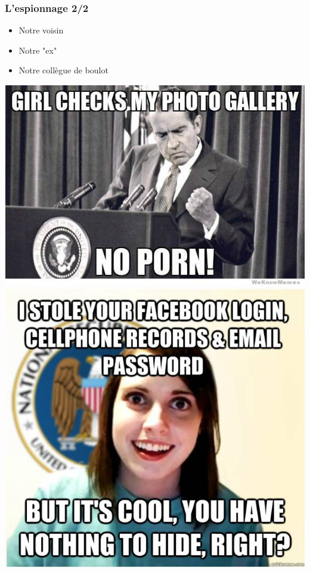 \documentclass{beamer}
\begin{document}
\begin{frame}
\frametitle{L'espionnage 2/2}
\begin{itemize}
\item Notre voisin
\item Notre "ex"
\item Notre collègue de boulot 
\end{itemize}
\includegraphics[scale=0.55]{./images/nixon.jpg}
\includegraphics[scale=0.4]{./images/girlfriend.jpg}
\end{frame}
\end{document}
